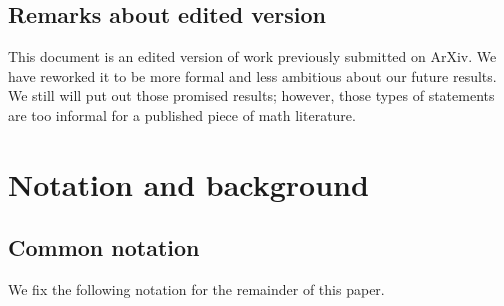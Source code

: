 \documentclass{tac}
\begin{document}
\subsection{Remarks about edited version}
This document is an edited version of work previously submitted on ArXiv. We have reworked it to be more formal and less ambitious about our future results. We still will put out those promised results; however, those types of statements are too informal for a published piece of math literature. 
 
\section{Notation and background}

\subsection*{Common notation}

We fix the following notation for the remainder of this paper.
\end{document}
